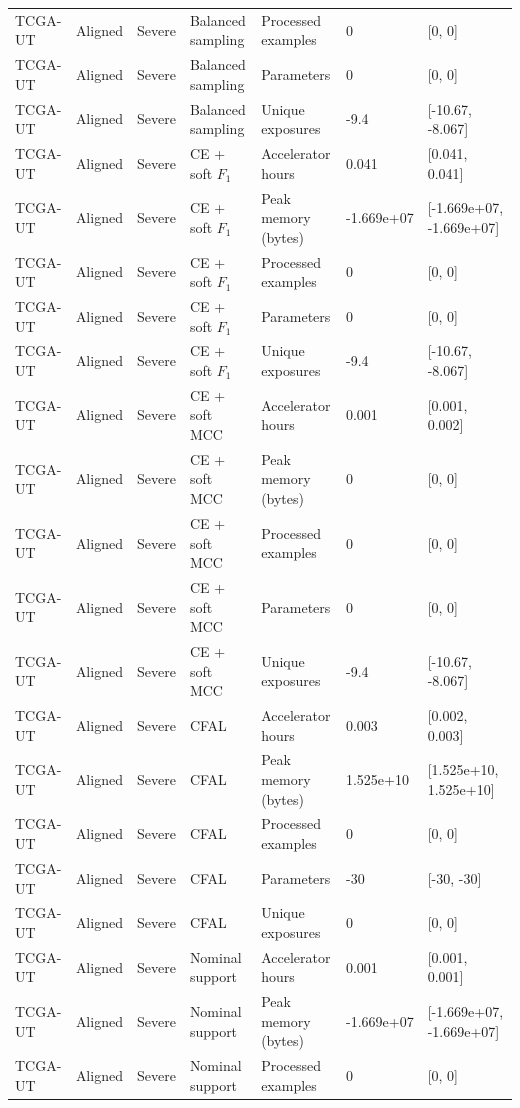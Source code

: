 \begin{longtable}{lllllll}
TCGA-UT & Aligned & Severe & Balanced sampling & Processed examples & 0 & [0, 0] \\
TCGA-UT & Aligned & Severe & Balanced sampling & Parameters & 0 & [0, 0] \\
TCGA-UT & Aligned & Severe & Balanced sampling & Unique exposures & -9.4 & [-10.67, -8.067] \\
TCGA-UT & Aligned & Severe & CE + soft $F_1$ & Accelerator hours & 0.041 & [0.041, 0.041] \\
TCGA-UT & Aligned & Severe & CE + soft $F_1$ & Peak memory (bytes) & -1.669e+07 & [-1.669e+07, -1.669e+07] \\
TCGA-UT & Aligned & Severe & CE + soft $F_1$ & Processed examples & 0 & [0, 0] \\
TCGA-UT & Aligned & Severe & CE + soft $F_1$ & Parameters & 0 & [0, 0] \\
TCGA-UT & Aligned & Severe & CE + soft $F_1$ & Unique exposures & -9.4 & [-10.67, -8.067] \\
TCGA-UT & Aligned & Severe & CE + soft MCC & Accelerator hours & 0.001 & [0.001, 0.002] \\
TCGA-UT & Aligned & Severe & CE + soft MCC & Peak memory (bytes) & 0 & [0, 0] \\
TCGA-UT & Aligned & Severe & CE + soft MCC & Processed examples & 0 & [0, 0] \\
TCGA-UT & Aligned & Severe & CE + soft MCC & Parameters & 0 & [0, 0] \\
TCGA-UT & Aligned & Severe & CE + soft MCC & Unique exposures & -9.4 & [-10.67, -8.067] \\
TCGA-UT & Aligned & Severe & CFAL & Accelerator hours & 0.003 & [0.002, 0.003] \\
TCGA-UT & Aligned & Severe & CFAL & Peak memory (bytes) & 1.525e+10 & [1.525e+10, 1.525e+10] \\
TCGA-UT & Aligned & Severe & CFAL & Processed examples & 0 & [0, 0] \\
TCGA-UT & Aligned & Severe & CFAL & Parameters & -30 & [-30, -30] \\
TCGA-UT & Aligned & Severe & CFAL & Unique exposures & 0 & [0, 0] \\
TCGA-UT & Aligned & Severe & Nominal support & Accelerator hours & 0.001 & [0.001, 0.001] \\
TCGA-UT & Aligned & Severe & Nominal support & Peak memory (bytes) & -1.669e+07 & [-1.669e+07, -1.669e+07] \\
TCGA-UT & Aligned & Severe & Nominal support & Processed examples & 0 & [0, 0] \\

\end{longtable}

